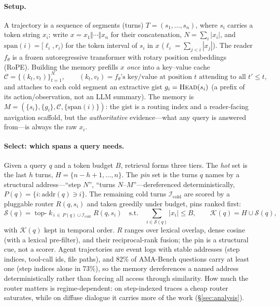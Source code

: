 \documentclass{article} %
\begin{document}
\paragraph{Setup.} A trajectory is a sequence of segments (turns)
$T=(s_1,\dots,s_n)$, where $s_i$ carries a token string $x_i$; write
$x=x_1\Vert\cdots\Vert x_n$ for their concatenation, $N=\sum_i|x_i|$, and
$\mathrm{span}(i)=[\ell_i,r_i)$ for the token interval of $s_i$ in $x$
($\ell_i=\sum_{j<i}|x_j|$). The reader $f_\theta$ is a frozen autoregressive
transformer with rotary position embeddings (RoPE). Building the memory prefills
$x$ \emph{once} into a key--value cache
\[
  \mathcal{C}=\{(k_t,v_t)\}_{t=1}^{N},\qquad
  (k_t,v_t)=f_\theta\text{'s key/value at position }t\text{ attending to all }t'\le t,
\]
and attaches to each cold segment an extractive gist $g_i=\textsc{Head}(s_i)$ (a
prefix of its action/observation, not an LLM summary). The memory is
$M=(\{s_i\},\{g_i\},\mathcal{C},\{\mathrm{span}(i)\})$: the gist is a routing
index and a reader-facing navigation scaffold, but the \emph{authoritative}
evidence---what any query is answered from---is always the raw $x_i$.

\paragraph{Select: which spans a query needs.} Given a query $q$ and a token
budget $B$, retrieval forms three tiers. The \emph{hot} set is the last $h$
turns, $H=\{n{-}h{+}1,\dots,n\}$. The \emph{pin} set is the turns $q$ names by a
structural address---``step $N$'', ``turns $N$--$M$''---dereferenced
deterministically, $P(q)=\{i:\mathrm{addr}(q)\ni i\}$. The remaining cold turns
$\mathcal{I}_{\mathrm{cold}}$ are scored by a pluggable router $R(q,s_i)$ and
taken greedily under budget, pins ranked first:
\[
  \mathcal{S}(q)=\operatorname*{top\text{-}}k_{\,i\,\in\,P(q)\cup\mathcal{I}_{\mathrm{cold}}}\;R(q,s_i)
  \quad\text{s.t.}\quad \sum_{i\in\mathcal{S}(q)}|x_i|\le B,
  \qquad \mathcal{K}(q)=H\cup\mathcal{S}(q),
\]
with $\mathcal{K}(q)$ kept in temporal order. $R$ ranges over lexical overlap,
dense cosine (with a lexical pre-filter), and their reciprocal-rank fusion; the
pin is a structural cue, not a scorer. Agent trajectories are event logs with
stable addresses (step indices, tool-call ids, file paths), and $82\%$ of
AMA-Bench questions carry at least one (step indices alone in $73\%$), so the
memory dereferences a named address deterministically rather than forcing all
access through similarity. How
much the router matters is regime-dependent: on step-indexed traces a cheap
router saturates, while on diffuse dialogue it carries more of the work
(\S\ref{sec:analysis}).
\end{document}
